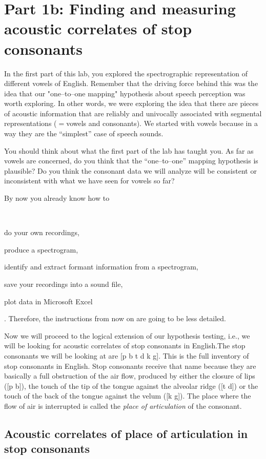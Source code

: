 \documentclass{article}
\newcommand{\soft}[1]{\textsf{#1}}
\newcommand{\MSExcel}{\soft{Microsoft\texttrademark{} Excel}}
\begin{document}
\section{Part 1b: Finding and measuring acoustic correlates of stop consonants}

In the first part of this lab, you explored the spectrographic representation of different vowels of English. Remember that the driving force behind this was the idea that our "one--to--one mapping" hypothesis about speech perception was worth exploring. In other words, we were exploring the idea that there are pieces of acoustic information that are reliably and univocally associated with segmental representations ($=$vowels and consonants). We started with vowels because in a way they are the ``simplest'' case of speech sounds.

You should think about what the first part of the lab has taught you. As far as vowels are concerned, do you think  that the ``one--to--one'' mapping hypothesis is plausible? Do you think the consonant data we will analyze will be consistent or inconsistent with what we have seen for vowels so far?

By now you already know how to\begin{inparaenum}[(a)]~\item do your own recordings, \item produce a spectrogram, \item identify and extract formant information from a spectrogram, \item save your recordings into a sound file, \item plot data in \MSExcel{}\end{inparaenum}. Therefore, the instructions from now on are going to be less detailed.

Now we will proceed to the logical extension of our hypothesis testing, i.e., we will be looking for acoustic correlates of stop consonants in English.The stop consonants we will be looking at are [p b t d k g]. This is the full inventory of stop consonants in English. Stop consonants receive that name because they are basically a full obstruction of the air flow, produced by either the closure of lips ([p b]), the touch of the tip of the tongue against the alveolar ridge ([t d]) or the touch of the back of the tongue against the velum ([k g]). The place where the flow of air is interrupted is called the \emph{place of articulation} of the consonant.

\subsection{Acoustic correlates of place of articulation in stop consonants}
\end{document}
